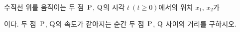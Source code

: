 수직선 위를 움직이는 두 점~$\mathrm{P}$, $\mathrm{Q}$의 시각 $t\ (t\ge 0)$에서의 위치 $x_1$, $x_2$가 \par\smallskip{}\par\smallskip\noindent 이다. 두 점~$\mathrm{P}$, $\mathrm{Q}$의 속도가 같아지는 순간 두 점~$\mathrm{P}$, $\mathrm{Q}$ 사이의 거리를 구하시오.
